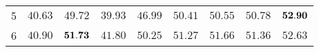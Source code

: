 \begin{table}[ht!]
\begin{tabular}{ccccccccc}
5                                       & $40.63$  \cellcolor[HTML]{C0C0C0}    & ${49.72}$                              & $39.93$  \cellcolor[HTML]{C0C0C0}    & $46.99$                              & $50.41$  \cellcolor[HTML]{C0C0C0}   & $50.55$                             & $50.78$ \cellcolor[HTML]{C0C0C0}    & $\bf{52.90}$               \\
6                                       & $40.90$  \cellcolor[HTML]{C0C0C0}    & ${\bf 51.73}$                          & $41.80$  \cellcolor[HTML]{C0C0C0}    & $50.25$                              & $51.27$  \cellcolor[HTML]{C0C0C0}   & $51.66$                             & $51.36$ \cellcolor[HTML]{C0C0C0}    & $52.63$                    \\ \hline
\end{tabular}
\end{table}
